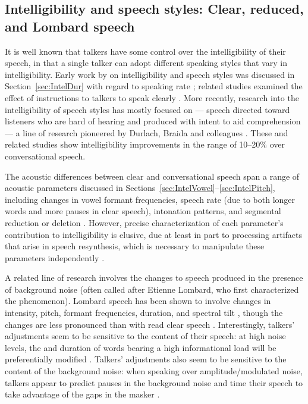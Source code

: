 \subsection[Intelligibility and speech styles]{Intelligibility and speech styles: Clear, reduced, and Lombard speech\label{sec:SpeechStyle}}
It is well known that talkers have some control over the intelligibility of their speech, in that a single talker can adopt different speaking styles that vary in intelligibility.  Early work by \citeauthor*{Tolhurst1957a} on intelligibility and speech styles was discussed in Section~\ref{sec:IntelDur} with regard to speaking rate \citep{Tolhurst1957a}; related studies examined the effect of instructions to talkers to speak clearly \citep{Tolhurst1954, Tolhurst1955}.  More recently, research into the intelligibility of speech styles has mostly focused on  — speech directed toward listeners who are hard of hearing and produced with intent to aid comprehension — a line of research pioneered by Durlach, Braida and colleagues \citep[\eg,][]{PichenyEtAl1985, PichenyEtAl1986, PichenyEtAl1989, UchanskiEtAl1996, KrauseBraida2004}.  These and related studies show intelligibility improvements in the range of 10–20\% over conversational speech.

The acoustic differences between clear and conversational speech span a range of acoustic parameters discussed in Sections~\ref{sec:IntelVowel}–\ref{sec:IntelPitch}, including changes in vowel formant frequencies, speech rate (due to both longer words and more pauses in clear speech), intonation patterns, and segmental reduction or deletion \citep[see][\intal]{PichenyEtAl1986, LiLoizou2008, SmiljanicBradlow2008, HazanBaker2011}.  However, precise characterization of each parameter’s contribution to intelligibility is elusive, due at least in part to processing artifacts that arise in speech resynthesis, which is necessary to manipulate these parameters independently \citep[cf. discussions in][]{PichenyEtAl1989, UchanskiEtAl1996, LiuZeng2006, KrauseBraida2009}.

A related line of research involves the changes to speech produced in the presence of background noise (often called  after Etienne Lombard, who first characterized the phenomenon).  Lombard speech has been shown to involve changes in intensity, pitch, formant frequencies, duration, and spectral tilt \citep{LaneTranel1971, SummersEtAl1988, LuCooke2008}, though the changes are less pronounced than with read clear speech \citep{HazanBaker2011}.  Interestingly, talkers’ adjustments seem to be sensitive to the content of their speech: at high noise levels, the \fo{} and duration of words bearing a high informational load will be preferentially modified \citep{PatelSchell2008}.  Talkers’ adjustments also seem to be sensitive to the content of the background noise: when speaking over amplitude\-/modulated noise, talkers appear to predict pauses in the background noise and time their speech to take advantage of the gaps in the masker \citep{CookeLu2010}.  

